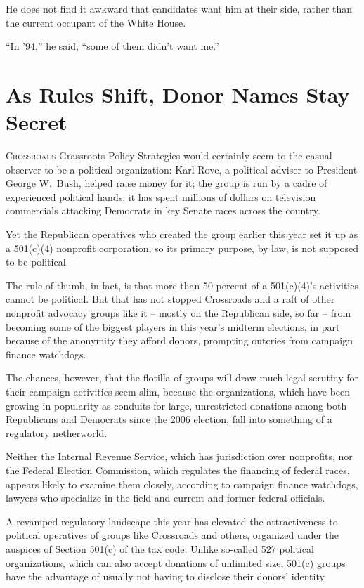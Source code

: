 ﻿\documentclass[12pt]{article}
\begin{document}
He does not find it awkward that candidates want him at their side, rather than the current occupant
of the White House.

``In '94,'' he said, ``some of them didn't want me.''

\pagebreak
\section{As Rules Shift, Donor Names Stay Secret}

\lettrine{C}{rossroads} Grassroots Policy Strategies would certainly seem
to the casual observer to be a political organization: Karl Rove, a political adviser to President
George W.~Bush, helped raise money for it; the group is run by a cadre of experienced political
hands; it has spent millions of dollars on television commercials attacking Democrats in key Senate
races across the country.

Yet the Republican operatives who created the group earlier this year set it up as a 501(c)(4)
nonprofit corporation, so its primary purpose, by law, is not supposed to be political.

The rule of thumb, in fact, is that more than 50 percent of a 501(c)(4)'s activities cannot be
political. But that has not stopped Crossroads and a raft of other nonprofit advocacy groups like it
-- mostly on the Republican side, so far -- from becoming some of the biggest players in this year's
midterm elections, in part because of the anonymity they afford donors, prompting outcries from
campaign finance watchdogs.

The chances, however, that the flotilla of groups will draw much legal scrutiny for their campaign
activities seem slim, because the organizations, which have been growing in popularity as conduits
for large, unrestricted donations among both Republicans and Democrats since the 2006 election, fall
into something of a regulatory netherworld.

Neither the Internal Revenue Service, which has jurisdiction over nonprofits, nor the Federal
Election Commission, which regulates the financing of federal races, appears likely to examine them
closely, according to campaign finance watchdogs, lawyers who specialize in the field and current
and former federal officials.

A revamped regulatory landscape this year has elevated the attractiveness to political operatives of
groups like Crossroads and others, organized under the auspices of Section 501(c) of the tax code.
Unlike so-called 527 political organizations, which can also accept donations of unlimited size,
501(c) groups have the advantage of usually not having to disclose their donors' identity.
\end{document}
